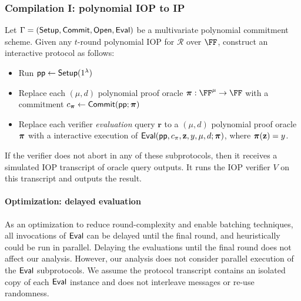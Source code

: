 \subsubsection*{Compilation I: polynomial IOP to IP} 
Let $\Gamma = (\textsf{{Setup}}, \textsf{{Commit}}, \textsf{{Open}}, \textsf{{Eval}})$ be a multivariate polynomial commitment scheme. Given any $t$-round polynomial IOP for $\mathcal{R}$ over $\FF$, construct an interactive protocol as follows: 
\begin{itemize}
\item Run $\textsf{pp} \leftarrow \textsf{{Setup}}(1^\lambda)$
\item Replace each $(\mu, d)$ polynomial proof oracle $\proofO: \FF^\mu \rightarrow \FF$ with a commitment $c_{\boldsymbol{\pi}} \leftarrow \textsf{{Commit}}(\textsf{pp}; \boldsymbol{\pi})$ 
\item Replace each verifier \emph{evaluation} query $\mathbf{r}$ to a $(\mu, d)$ polynomial proof oracle $\boldsymbol{\pi}$ with a interactive execution of $\textsf{{Eval}}(\textsf{pp}, c_\pi, \mathbf{z}, y, \mu, d; \boldsymbol{\pi})$, where $\boldsymbol{\pi}(\mathbf{z}) = y$. 
\end{itemize}

If the verifier does not abort in any of these subprotocols, then it receives a simulated IOP transcript of oracle query outputs. It runs the IOP verifier $V$ on this transcript and outputs the result. 

\paragraph{Optimization: delayed evaluation} As an optimization to reduce round-complexity and enable batching techniques, all invocations of $\textsf{{Eval}}$ can be delayed until the final round, and heuristically could be run in parallel. Delaying the evaluations until the final round does not affect our analysis. However, our analysis does not consider parallel execution of the $\textsf{{Eval}}$ subprotocols. We assume the protocol transcript contains an isolated copy of each $\textsf{{Eval}}$ instance and does not interleave messages or re-use randomness.

